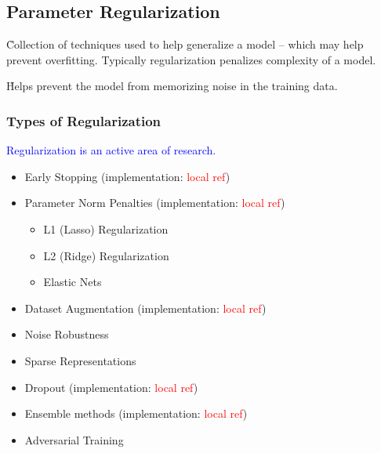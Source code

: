 




\subsection{Parameter Regularization}

\r{Collection of techniques used to help generalize a model -- which may help prevent overfitting. Typically regularization penalizes complexity of a model.}



\r{Helps prevent the model from memorizing noise in the training data.}


\subsubsection{Types of Regularization}

\textcolor{blue}{Regularization is an active area of research.}


\begin{itemize}[noitemsep,topsep=0pt]
	\item Early Stopping (implementation: \textcolor{red}{local ref})
	\item Parameter Norm Penalties (implementation: \textcolor{red}{local ref})
	\begin{itemize}[noitemsep,topsep=0pt]
		\item L1 (Lasso) Regularization
		\item L2 (Ridge) Regularization
		\item Elastic Nets
	\end{itemize}
	\item Dataset Augmentation (implementation: \textcolor{red}{local ref})
	\item Noise Robustness
	\item Sparse Representations
	\item Dropout (implementation: \textcolor{red}{local ref})
	\item Ensemble methods (implementation: \textcolor{red}{local ref})
	\item Adversarial Training
\end{itemize}



